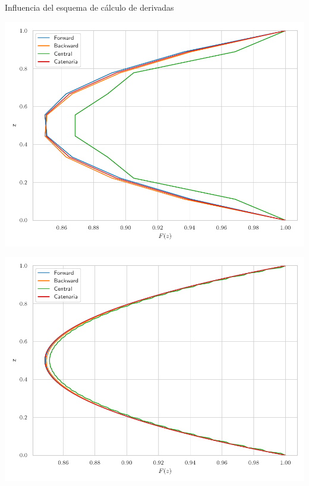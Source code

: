 \documentclass[11pt]{beamer}
\begin{document}
            \begin{frame}{Influencia del esquema de cálculo de derivadas}
                \begin{minipage}[b]{0.43\textwidth}
                    \centering
                    \includegraphics[width=\textwidth]{Figuras/sol_deriv_n10.pdf}
                \end{minipage}
                \hfill
                \begin{minipage}[b]{0.43\textwidth}
                    \centering
                    \includegraphics[width=\textwidth]{Figuras/sol_deriv_n100.pdf}
                \end{minipage}
            

\end{frame}
\end{document}
